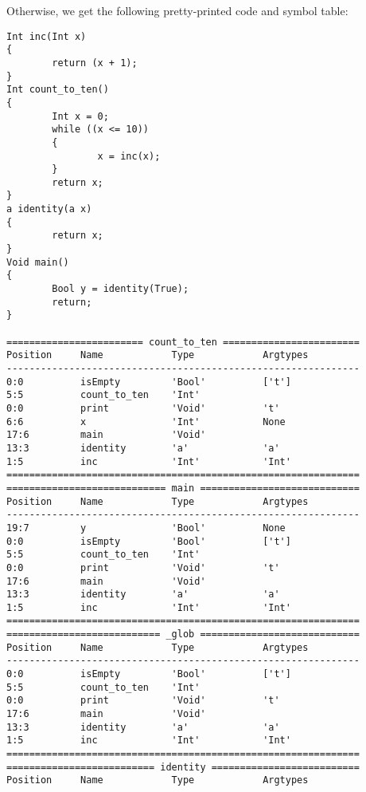 \documentclass[a4paper]{article}
\begin{document}
Otherwise, we get the following pretty-printed code and symbol table: 
\begin{verbatim}
Int inc(Int x)
{
        return (x + 1);
}
Int count_to_ten()
{
        Int x = 0;
        while ((x <= 10))
        {
                x = inc(x);
        }
        return x;
}
a identity(a x)
{
        return x;
}
Void main()
{
        Bool y = identity(True);
        return;
}

======================== count_to_ten ========================
Position     Name            Type            Argtypes            
--------------------------------------------------------------
0:0          isEmpty         'Bool'          ['t']               
5:5          count_to_ten    'Int'                               
0:0          print           'Void'          't'                 
6:6          x               'Int'           None                
17:6         main            'Void'                              
13:3         identity        'a'             'a'                 
1:5          inc             'Int'           'Int'               
==============================================================
============================ main ============================
Position     Name            Type            Argtypes            
--------------------------------------------------------------
19:7         y               'Bool'          None                
0:0          isEmpty         'Bool'          ['t']               
5:5          count_to_ten    'Int'                               
0:0          print           'Void'          't'                 
17:6         main            'Void'                              
13:3         identity        'a'             'a'                 
1:5          inc             'Int'           'Int'               
==============================================================
=========================== _glob ============================
Position     Name            Type            Argtypes            
--------------------------------------------------------------
0:0          isEmpty         'Bool'          ['t']               
5:5          count_to_ten    'Int'                               
0:0          print           'Void'          't'                 
17:6         main            'Void'                              
13:3         identity        'a'             'a'                 
1:5          inc             'Int'           'Int'               
==============================================================
========================== identity ==========================
Position     Name            Type            Argtypes            

\end{verbatim}
\end{document}
